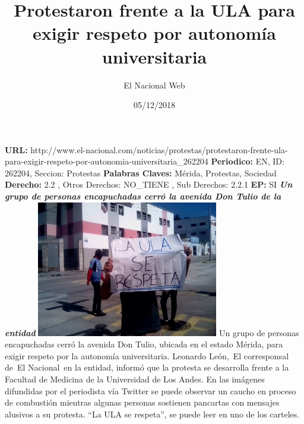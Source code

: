 \documentclass{article}%
\title{\textbf{Protestaron frente a la ULA para exigir respeto por autonomía universitaria}}%
\author{El Nacional Web}%
\date{05/12/2018}%
\begin{document}
%
\normalsize%
\maketitle%
\textbf{URL: }%
http://www.el{-}nacional.com/noticias/protestas/protestaron{-}frente{-}ula{-}para{-}exigir{-}respeto{-}por{-}autonomia{-}universitaria\_262204\newline%
%
\textbf{Periodico: }%
EN, %
ID: %
262204, %
Seccion: %
Protestas\newline%
%
\textbf{Palabras Claves: }%
Mérida, Protestas, Sociedad\newline%
%
\textbf{Derecho: }%
2.2%
, Otros Derechos: %
NO\_TIENE%
, Sub Derechos: %
2.2.1%
\newline%
%
\textbf{EP: }%
SI\newline%
\newline%
%
\textbf{\textit{Un grupo de personas encapuchadas cerró la avenida Don Tulio de la entidad}}%
\newline%
\newline%
%
\includegraphics[width=300px]{33.jpg}%
\newline%
%
Un grupo de personas encapuchadas cerró la avenida Don Tulio, ubicada en el estado Mérida, para exigir respeto por la autonomía universitaria.%
\newline%
%
Leonardo León,~El corresponsal de~El Nacional~en la entidad, informó que la protesta se desarrolla frente a la Facultad de Medicina de la Universidad de Los Andes.%
\newline%
%
En las imágenes difundidas por el periodista vía Twitter se puede observar un caucho en proceso de combustión mientras algunas personas sostienen pancartas con mensajes alusivos a su protesta.%
\newline%
%
“La ULA se respeta”, se puede leer en uno de los carteles.%
\newline%
%
\end{document}
